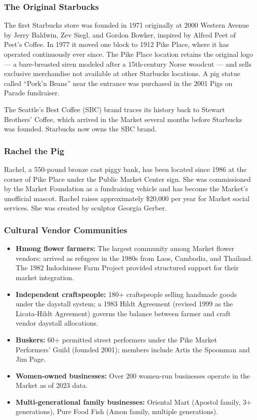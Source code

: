 \documentclass[11pt,letterpaper]{article}
\begin{document}
\subsubsection{The Original Starbucks}

The first Starbucks store was founded in 1971 originally at 2000 Western Avenue by Jerry Baldwin, Zev Siegl, and Gordon Bowker, inspired by Alfred Peet of Peet's Coffee. In 1977 it moved one block to 1912 Pike Place, where it has operated continuously ever since. The Pike Place location retains the original logo --- a bare-breasted siren modeled after a 15th-century Norse woodcut --- and sells exclusive merchandise not available at other Starbucks locations. A pig statue called ``Pork'n Beans'' near the entrance was purchased in the 2001 Pigs on Parade fundraiser.

The Seattle's Best Coffee (SBC) brand traces its history back to Stewart Brothers' Coffee, which arrived in the Market several months before Starbucks was founded. Starbucks now owns the SBC brand.

\subsubsection{Rachel the Pig}

Rachel, a 550-pound bronze cast piggy bank, has been located since 1986 at the corner of Pike Place under the Public Market Center sign. She was commissioned by the Market Foundation as a fundraising vehicle and has become the Market's unofficial mascot. Rachel raises approximately \$20,000 per year for Market social services. She was created by sculptor Georgia Gerber.

\subsubsection{Cultural Vendor Communities}

\begin{itemize}[noitemsep]
  \item \textbf{Hmong flower farmers:} The largest community among Market flower vendors; arrived as refugees in the 1980s from Laos, Cambodia, and Thailand. The 1982 Indochinese Farm Project provided structured support for their market integration.
  \item \textbf{Independent craftspeople:} 180+ craftspeople selling handmade goods under the daystall system; a 1983 Hildt Agreement (revised 1999 as the Licata-Hildt Agreement) governs the balance between farmer and craft vendor daystall allocations.
  \item \textbf{Buskers:} 60+ permitted street performers under the Pike Market Performers' Guild (founded 2001); members include Artis the Spoonman and Jim Page.
  \item \textbf{Women-owned businesses:} Over 200 women-run businesses operate in the Market as of 2023 data.
  \item \textbf{Multi-generational family businesses:} Oriental Mart (Apostol family, 3+ generations), Pure Food Fish (Amon family, multiple generations).
\end{itemize}
\end{document}
